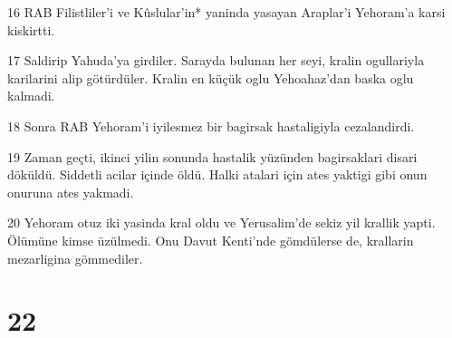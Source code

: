 \par 16 RAB Filistliler'i ve Kûslular'in* yaninda yasayan Araplar'i Yehoram'a karsi kiskirtti.
\par 17 Saldirip Yahuda'ya girdiler. Sarayda bulunan her seyi, kralin ogullariyla karilarini alip götürdüler. Kralin en küçük oglu Yehoahaz'dan baska oglu kalmadi.
\par 18 Sonra RAB Yehoram'i iyilesmez bir bagirsak hastaligiyla cezalandirdi.
\par 19 Zaman geçti, ikinci yilin sonunda hastalik yüzünden bagirsaklari disari döküldü. Siddetli acilar içinde öldü. Halki atalari için ates yaktigi gibi onun onuruna ates yakmadi.
\par 20 Yehoram otuz iki yasinda kral oldu ve Yerusalim'de sekiz yil krallik yapti. Ölümüne kimse üzülmedi. Onu Davut Kenti'nde gömdülerse de, krallarin mezarligina gömmediler.

\chapter{22}


